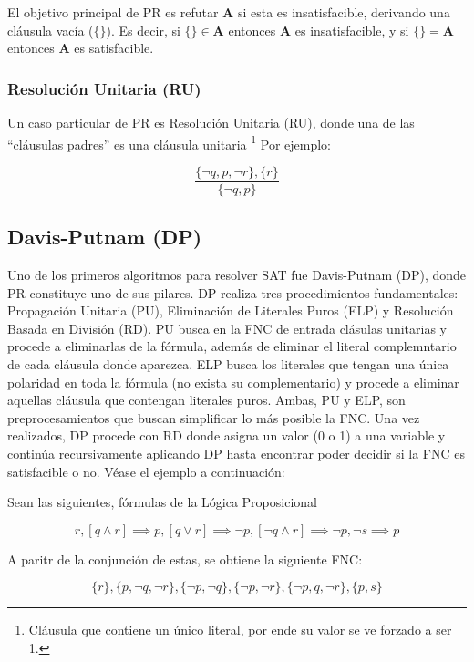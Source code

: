 El objetivo principal de PR es refutar $\textbf{A}$ si esta es insatisfacible, derivando una cláusula vacía ($\{\}$). Es decir, si $\{\} \in \textbf{A}$ entonces $\textbf{A}$ es insatisfacible, y si $\{\} = \textbf{A}$ entonces $\textbf{A}$ es satisfacible.

\subsubsection{Resolución Unitaria (RU)}
Un caso particular de PR es Resolución Unitaria (RU), donde una de las ``cláusulas padres'' es una cláusula unitaria \footnote{Cláusula que contiene un único literal, por ende su valor se ve forzado a ser 1.} Por ejemplo:

\begin{equation*}
\dfrac{\{\neg q, p, \neg r\},\{r\}}{\{\neg q, p\}}
\end{equation*}


\subsection{Davis-Putnam (DP)}
Uno de los primeros algoritmos para resolver SAT fue Davis-Putnam (DP), donde PR constituye uno de sus pilares. DP realiza tres procedimientos fundamentales: Propagación Unitaria (PU), Eliminación de Literales Puros (ELP) y Resolución Basada en División (RD). PU busca en la FNC de entrada clásulas unitarias y procede a eliminarlas de la fórmula, además de eliminar el literal complemntario de cada cláusula donde aparezca. ELP busca los literales que tengan una única polaridad en toda la fórmula (no exista su complementario) y procede a eliminar aquellas cláusula que contengan literales puros. Ambas, PU y ELP, son preprocesamientos que buscan simplificar lo más posible la FNC. Una vez realizados, DP procede con RD donde asigna un valor (0 o 1) a una variable y continúa recursivamente aplicando DP hasta encontrar poder decidir si la FNC es satisfacible o no. Véase el ejemplo a continuación:

Sean las siguientes, fórmulas de la Lógica Proposicional

\begin{equation*}
r, [q \land r] \implies p, [q \lor r ] \implies \neg p, [\neg q \land r] \implies \neg p, \neg s \implies p
\end{equation*}


A paritr de la conjunción de estas, se obtiene la siguiente FNC:

\begin{equation*}
{\{r\}, \{p,\neg q, \neg r\}, \{\neg p, \neg q\}, \{\neg p, \neg r\}, \{\neg p,q,\neg r\}, \{p,s\}}
\end{equation*}

